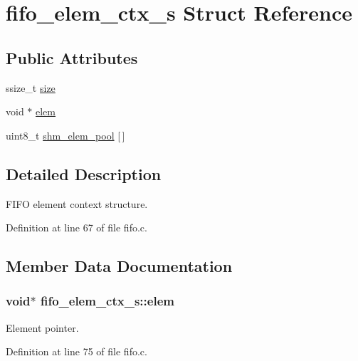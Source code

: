 \hypertarget{structfifo__elem__ctx__s}{}\section{fifo\+\_\+elem\+\_\+ctx\+\_\+s Struct Reference}
\label{structfifo__elem__ctx__s}
\subsection*{Public Attributes}
\begin{DoxyCompactItemize}
\item 
ssize\+\_\+t \hyperlink{structfifo__elem__ctx__s_af24ec8cd7ee7365d825ed9148ff2e50a}{size}
\item 
void $\ast$ \hyperlink{structfifo__elem__ctx__s_ae5add7272abafb06c8bc1a810c4b7719}{elem}
\item 
uint8\+\_\+t \hyperlink{structfifo__elem__ctx__s_a77ec4386ce2ca348e6d9c9ced4fafa92}{shm\+\_\+elem\+\_\+pool} \mbox{[}$\,$\mbox{]}
\end{DoxyCompactItemize}


\subsection{Detailed Description}
F\+I\+FO element context structure. 

Definition at line 67 of file fifo.\+c.



\subsection{Member Data Documentation}
\subsubsection[{\texorpdfstring{elem}{elem}}]{\setlength{\rightskip}{0pt plus 5cm}void$\ast$ fifo\+\_\+elem\+\_\+ctx\+\_\+s\+::elem}\hypertarget{structfifo__elem__ctx__s_ae5add7272abafb06c8bc1a810c4b7719}{}\label{structfifo__elem__ctx__s_ae5add7272abafb06c8bc1a810c4b7719}
Element pointer. 

Definition at line 75 of file fifo.\+c.

